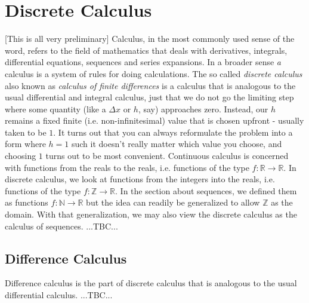 \chapter{Discrete Calculus}
[This is all very preliminary] Calculus, in the most commonly used sense of the word, refers to the field of mathematics that deals with derivatives, integrals, differential equations, sequences and series expansions. In a broader sense \emph{a} calculus is a system of rules for doing calculations. The so called \emph{discrete calculus} also known as \emph{calculus of finite differences} is a calculus that is analogous to the usual differential and integral calculus, just that we do not go the limiting step where some quantity (like a $\Delta x$ or $h$, say) approaches zero. Instead, our $h$ remains a fixed finite (i.e. non-infinitesimal) value that is chosen upfront - usually taken to be $1$. It turns out that you can always reformulate the problem into a form where $h = 1$ such it doesn't really matter which value you choose, and choosing $1$ turns out to be most convenient. Continuous calculus is concerned with functions from the reals to the reals, i.e. functions of the type $f: \mathbb{R} \rightarrow \mathbb{R}$. In discrete calculus, we look at functions from the integers into the reals, i.e. functions of the type $f: \mathbb{Z} \rightarrow \mathbb{R}$. In the section about sequences, we defined them as functions $f: \mathbb{N} \rightarrow \mathbb{R}$ but the idea can readily be generalized to allow $\mathbb{Z}$ as the domain. With that generalization, we may also view the discrete calculus as the calculus of sequences. ...TBC...






\section{Difference Calculus}
Difference calculus is the part of discrete calculus that is analogous to the usual differential calculus. ...TBC...


